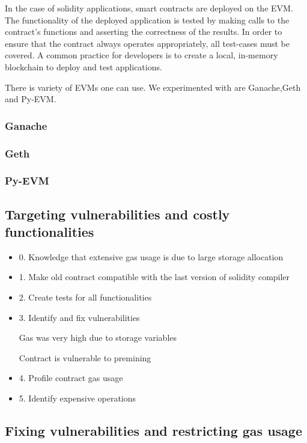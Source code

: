 \documentclass{article}
\begin{document}
In the case of solidity applications, smart contracts are deployed on the EVM. The functionality of the deployed application is tested by making calls to the contract's functions and asserting the correctness of the results. In order to ensure that the contract always operates appropriately, all test-cases must be covered. A common practice for developers is to create a local, in-memory blockchain to deploy and test applications.

There is variety of EVMs one can use. We experimented with are Ganache,Geth and Py-EVM.

\subsubsection{Ganache}
\subsubsection{Geth}
\subsubsection{Py-EVM}

\subsection{Targeting vulnerabilities and costly functionalities}
\begin{itemize}
\item 0. Knowledge that extensive gas usage is due to large storage allocation
\item 1. Make old contract compatible with the last version of solidity compiler
\item 2. Create tests for all functionalities
\item 3. Identify and fix vulnerabilities

Gas was very high due to storage variables

Contract is vulnerable to premining
\item 4. Profile contract gas usage
\item 5. Identify expensive operations
\end{itemize}
\subsection{Fixing vulnerabilities and restricting gas usage}
\end{document}
